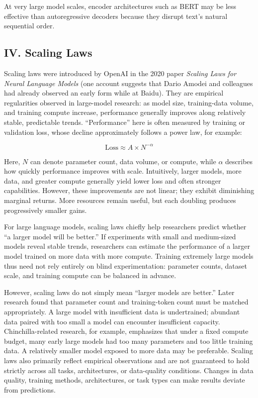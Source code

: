 At very large model scales, encoder architectures such as BERT may be less effective than autoregressive decoders because they disrupt text's natural sequential order.

\hypertarget{iv.-scaling-laws}{%
\subsection{IV. Scaling Laws}\label{iv.-scaling-laws}}

Scaling laws were introduced by OpenAI in the 2020 paper \emph{Scaling Laws for Neural Language Models} (one account suggests that Dario Amodei and colleagues had already observed an early form while at Baidu). They are empirical regularities observed in large-model research: as model size, training-data volume, and training compute increase, performance generally improves along relatively stable, predictable trends. ``Performance'' here is often measured by training or validation loss, whose decline approximately follows a power law, for example:

\[
\mathrm{Loss} \approx A \times N^{-\alpha}
\]

Here, \(N\) can denote parameter count, data volume, or compute, while \(\alpha\) describes how quickly performance improves with scale. Intuitively, larger models, more data, and greater compute generally yield lower loss and often stronger capabilities. However, these improvements are not linear; they exhibit diminishing marginal returns. More resources remain useful, but each doubling produces progressively smaller gains.

For large language models, scaling laws chiefly help researchers predict whether ``a larger model will be better.'' If experiments with small and medium-sized models reveal stable trends, researchers can estimate the performance of a larger model trained on more data with more compute. Training extremely large models thus need not rely entirely on blind experimentation: parameter counts, dataset scale, and training compute can be balanced in advance.

However, scaling laws do not simply mean ``larger models are better.'' Later research found that parameter count and training-token count must be matched appropriately. A large model with insufficient data is undertrained; abundant data paired with too small a model can encounter insufficient capacity. Chinchilla-related research, for example, emphasizes that under a fixed compute budget, many early large models had too many parameters and too little training data. A relatively smaller model exposed to more data may be preferable. Scaling laws also primarily reflect empirical observations and are not guaranteed to hold strictly across all tasks, architectures, or data-quality conditions. Changes in data quality, training methods, architectures, or task types can make results deviate from predictions.

